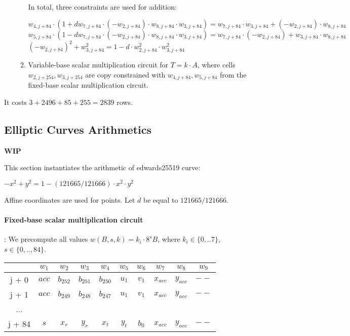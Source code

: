 \begin{enumerate}
\begin{enumerate}
                In total, three constraints are used for addition:
                \begin{center}
                    $w_{4, j + 84}\cdot (1 + d w_{7, j + 84} \cdot (-w_{2, j + 84}) \cdot w_{8, j + 84} \cdot w_{3, j + 84}) = w_{7, j + 84} \cdot w_{3, j + 84} + (-w_{2, j + 84}) \cdot w_{8, j + 84}$ \\
                    $w_{5, j + 84} \cdot (1 - d w_{7, j + 84} \cdot (-w_{2, j + 84}) \cdot w_{8, j + 84} \cdot w_{3, j + 84}) = w_{7, j + 84} \cdot (-w_{2, j + 84}) + w_{3, j + 84} \cdot w_{8, j + 84}$ \\
                    $(- w_{2, j + 84})^2 + w_{3, j + 84}^2 = 1 - d \cdot w_{2, j + 84}^2 \cdot w_{3, j + 84}^2$
                \end{center}
            \item Variable-base scalar multiplication circuit for $T = k \cdot A$, where cells $w_{2, j + 254}, w_{3, j + 254}$ are copy constrained with $w_{4, j + 84}, w _{5, j + 84}$ from the fixed-base scalar multiplication circuit.
        \end{enumerate}
\end{enumerate}
It costs $3 + 2496 + 85 + 255 = 2839$ rows.
\subsection{Elliptic Curves Arithmetics}
\label{ellcurve}
\textbf{WIP}

This section instantiates the arithmetic of edwards25519 curve:
\begin{center}
    $- x^2 + y^2 = 1 - (121665/121666) \cdot x^2 \cdot y^2$
\end{center}
Affine coordinates are used for points.
Let $d$ be equal to $121665/121666$.

\paragraph{Fixed-base scalar multiplication circuit}:
We precompute all values $w(B,s,k) = k_i \cdot 8^s B$, where $k_i \in \{ 0,..7 \}$, $s \in \{0,.., 84\}$.
\begin{center}
    \begin{tabular}{ c|c|c|c|c|c|c|c|c|c }
        & $w_1$  & $w_2$  & $w_3$  & $w_4$  & $w_5$  & $w_6$ & $w_7$ & $w_8$ & $w_9$  \\
        \hline
        j + 0  & $acc$  & $b_{252}$ & $b_{251}$ & $b_{250}$ & $u_1$ & $v_1$ & $x_{acc}$ & $y_{acc}$ & $--$   \\
        j + 1  & $acc$  & $b_{249}$ & $b_{248}$ & $b_{247}$ & $u_1$ & $v_1$ & $x_{acc}$ & $y_{acc}$ & $--$   \\
        ...    &             &             &             &             &      & & & &  \\
        j + 84 & $s$  & $x_r$ & $y_r$ & $x_t$ & $y_t$ & $b_{0}$ & $x_{acc}$ & $y_{acc}$ & $--$   \\
    \end{tabular}
\end{center}

